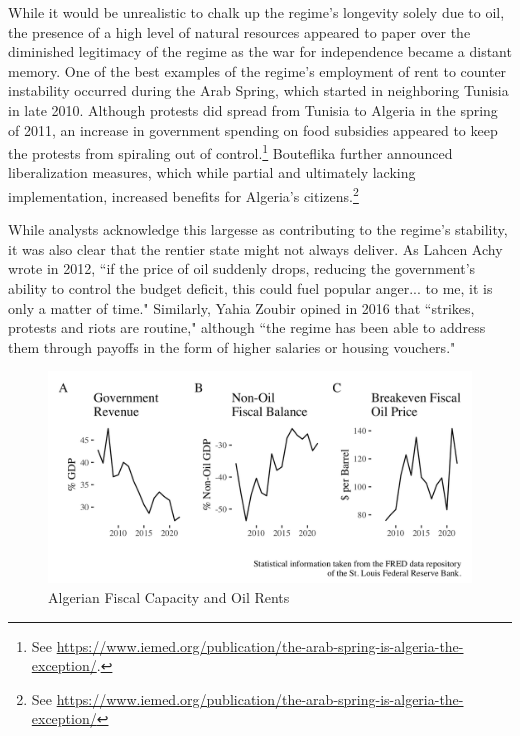 \documentclass[12pt, letterpaper]{article}
\begin{document}
While it would be unrealistic to chalk up the regime's longevity solely due to oil, the presence of a high level of natural resources appeared to paper over the diminished legitimacy of the regime as the war for independence became a distant memory. One of the best examples of the regime's employment of rent to counter instability occurred during the Arab Spring, which started in neighboring Tunisia in late 2010. Although protests did spread from Tunisia to Algeria in the spring of 2011, an increase in government spending on food subsidies appeared to keep the protests from spiraling out of control.\footnote{See \url{https://www.iemed.org/publication/the-arab-spring-is-algeria-the-exception/}.} Bouteflika further announced liberalization measures, which while partial and ultimately lacking implementation, increased benefits for Algeria's citizens.\footnote{See \url{https://www.iemed.org/publication/the-arab-spring-is-algeria-the-exception/}} 

While analysts acknowledge this largesse as contributing to the regime's stability, it was also clear that the rentier state might not always deliver. As Lahcen Achy wrote in 2012, ``if the price of oil suddenly drops, reducing the government’s ability to control the budget deficit, this could fuel popular anger... to me, it is only a matter of time." Similarly, Yahia Zoubir opined in 2016 that ``strikes, protests and riots are routine," although ``the regime has been able to address them through payoffs in the form of higher salaries or housing vouchers." \nocite{zoubir_algeria_2019,achy_algeria_2012}

\begin{figure}
    \centering
        \caption{Algerian Fiscal Capacity and Oil Rents}
    \label{fig:algrev}
    \includegraphics[width=\linewidth]{plots/oil_fiscal_capacity.png}
\end{figure}
\end{document}
